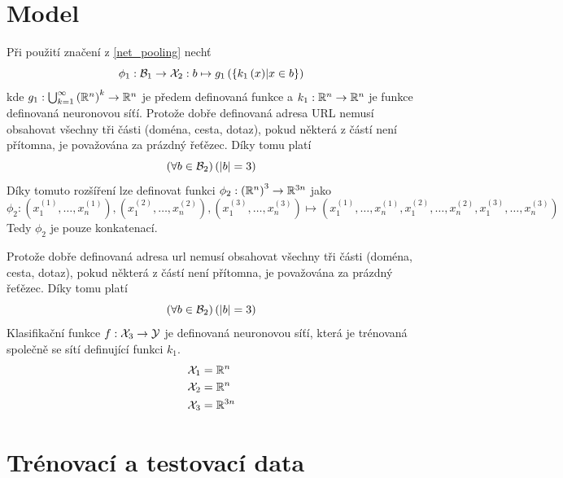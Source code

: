 \section{Model}
Při použití značení z \eqref{net_pooling} nechť
\begin{equation}
	\phi_1 : \mathcal B_1 \to \mathcal X_2 : b \mapsto g_1 \left( \left\{ k_1 \left( x \right) \middle| x \in b \right\} \right)
\end{equation}
kde \( g_1 : \bigcup_{k = 1}^{\infty} \left( \mathbb R^n \right)^k \to \mathbb R^n \) je předem definovaná funkce a \( k_1 : \mathbb R^n \to \mathbb R^n \) je funkce definovaná neuronovou síťí. Protože dobře definovaná adresa URL nemusí obsahovat všechny tři části (doména, cesta, dotaz), pokud některá z částí není přítomna, je považována za prázdný řeťězec. Díky tomu platí
\begin{equation}
	\left( \forall b \in \mathcal B_2 \right) \left( \left| b \right| = 3 \right)
\end{equation}
Díky tomuto rozšíření lze definovat funkci \( \phi_2 : \left( \mathbb R^n \right)^3 \to \mathbb R^{3n} \) jako
\begin{equation}
	\phi_2 : \left( x_1^{(1)}, \dots, x_n^{(1)} \right), \left( x_1^{(2)}, \dots, x_n^{(2)} \right), \left( x_1^{(3)}, \dots, x_n^{(3)} \right) \mapsto \left( x_1^{(1)}, \dots, x_n^{(1)}, x_1^{(2)}, \dots, x_n^{(2)}, x_1^{(3)}, \dots, x_n^{(3)} \right)
\end{equation}
Tedy \( \phi_2 \) je pouze konkatenací.

Protože dobře definovaná adresa url nemusí obsahovat všechny tři části (doména, cesta, dotaz), pokud některá z částí není přítomna, je považována za prázdný řeťězec. Díky tomu platí
\begin{equation}
	\left( \forall b \in \mathcal B_2 \right) \left( \left| b \right| = 3 \right)
\end{equation}
Klasifikační funkce \( f : \mathcal X_3 \to \mathcal Y \) je definovaná neuronovou síťí, která je trénovaná společně se sítí definující funkci \( k_1 \).
\begin{align}
	\mathcal X_1 &= \mathbb R^n \\
	\mathcal X_2 &= \mathbb R^n \\
	\mathcal X_3 &= \mathbb R^{3n}
\end{align}

\section{Trénovací a testovací data}

